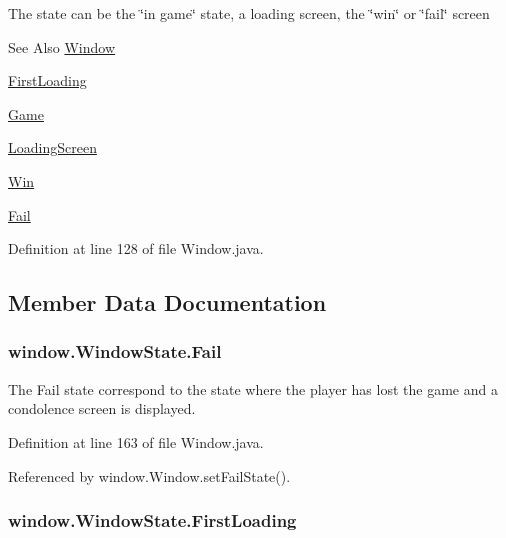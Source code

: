 The state can be the \char`\"{}in game\char`\"{} state, a loading screen, the \char`\"{}win\char`\"{} or \char`\"{}fail\char`\"{} screen \begin{DoxySeeAlso}{See Also}
\hyperlink{a00037}{Window} 

\hyperlink{a00038_a56269b4774b71a1dcba9e5e9cefb495e}{First\-Loading} 

\hyperlink{a00038_abb4a2512f88d7104f91993174488282d}{Game} 

\hyperlink{a00038_a281f52964a4be64ea19bf2a401184521}{Loading\-Screen} 

\hyperlink{a00038_adfd70a04c81f1ff3b289d5b766206fb5}{Win} 

\hyperlink{a00038_ace96026e75eb5118b66e8703fd93d68c}{Fail} 
\end{DoxySeeAlso}


Definition at line 128 of file Window.\-java.



\subsection{Member Data Documentation}
\hypertarget{a00038_ace96026e75eb5118b66e8703fd93d68c}{
\subsubsection[{Fail}]{\setlength{\rightskip}{0pt plus 5cm}window.\-Window\-State.\-Fail}}\label{a00038_ace96026e75eb5118b66e8703fd93d68c}


The Fail state correspond to the state where the player has lost the game and a condolence screen is displayed. 



Definition at line 163 of file Window.\-java.



Referenced by window.\-Window.\-set\-Fail\-State().

\hypertarget{a00038_a56269b4774b71a1dcba9e5e9cefb495e}{
\subsubsection[{First\-Loading}]{\setlength{\rightskip}{0pt plus 5cm}window.\-Window\-State.\-First\-Loading}}\label{a00038_a56269b4774b71a1dcba9e5e9cefb495e}



